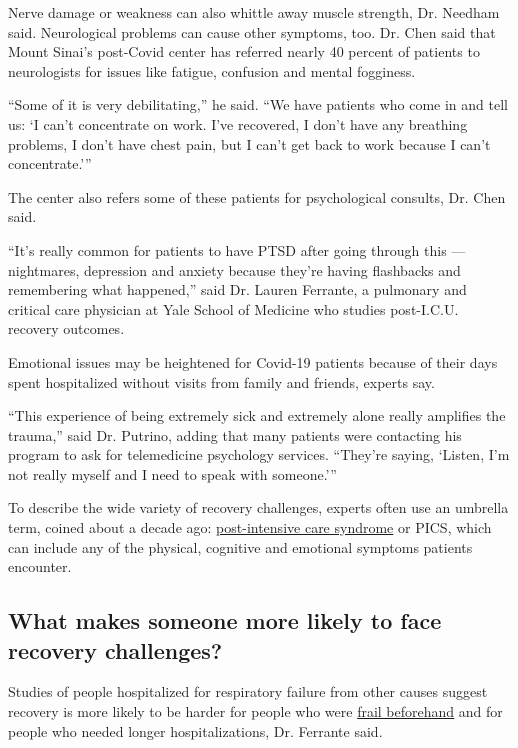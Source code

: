Nerve damage or weakness can also whittle away muscle strength, Dr.
Needham said. Neurological problems can cause other symptoms, too. Dr.
Chen said that Mount Sinai's post-Covid center has referred nearly 40
percent of patients to neurologists for issues like fatigue, confusion
and mental fogginess.

``Some of it is very debilitating,'' he said. ``We have patients who
come in and tell us: `I can't concentrate on work. I've recovered, I
don't have any breathing problems, I don't have chest pain, but I can't
get back to work because I can't concentrate.'''

The center also refers some of these patients for psychological
consults, Dr. Chen said.

``It's really common for patients to have PTSD after going through this
--- nightmares, depression and anxiety because they're having flashbacks
and remembering what happened,'' said Dr. Lauren Ferrante, a pulmonary
and critical care physician at Yale School of Medicine who studies
post-I.C.U. recovery outcomes.

Emotional issues may be heightened for Covid-19 patients because of
their days spent hospitalized without visits from family and friends,
experts say.

``This experience of being extremely sick and extremely alone really
amplifies the trauma,'' said Dr. Putrino, adding that many patients were
contacting his program to ask for telemedicine psychology services.
``They're saying, `Listen, I'm not really myself and I need to speak
with someone.'''

To describe the wide variety of recovery challenges, experts often use
an umbrella term, coined about a decade ago:
\href{https://www.sccm.org/MyICUCare/THRIVE/Post-intensive-Care-Syndrome\#:~:text=Post\%2Dintensive\%20care\%20syndrome\%2C\%20or\%20PICS\%2C\%20is\%20made\%20up,and\%20may\%20affect\%20the\%20family.}{post-intensive
care syndrome} or PICS, which can include any of the physical, cognitive
and emotional symptoms patients encounter.

\hypertarget{what-makes-someone-more-likely-to-face-recovery-challenges}{%
\subsection{What makes someone more likely to face recovery
challenges?}\label{what-makes-someone-more-likely-to-face-recovery-challenges}}

Studies of people hospitalized for respiratory failure from other causes
suggest recovery is more likely to be harder for people who were
\href{https://www.ncbi.nlm.nih.gov/pmc/articles/PMC6026287/}{frail
beforehand} and for people who needed longer hospitalizations, Dr.
Ferrante said.

